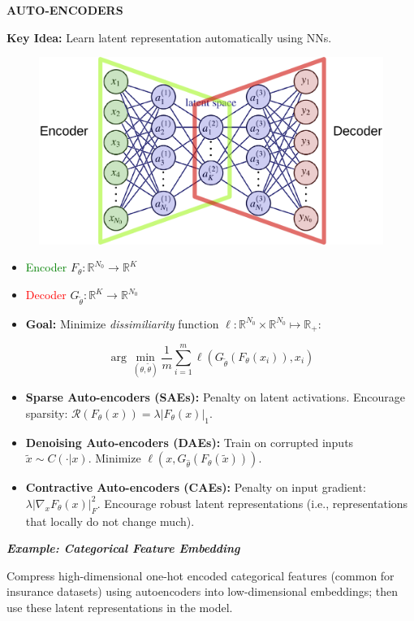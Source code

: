 \documentclass[a4paper,10pt]{article}
\def\R{\mathbb{R}}
\newcommand{\subtitle}[1]{\vspace{0.25cm}\begin{normalsize}\textbf{\textcolor{gray!150}{\uppercase{#1}}}\end{normalsize}}
\begin{document}
\begin{small}
\subtitle{Auto-encoders}

\textbf{Key Idea:} Learn latent representation automatically using NNs.
\begin{figure}
    \centering
    \vspace{-15pt}
    \includegraphics[width=0.45\columnwidth]{figures/Autoencoder.png}
    \vspace{-40pt}
\end{figure}
\begin{itemize}
    \item \textcolor{green}{Encoder} $F_\theta : \mathbb{R}^{N_0} \to \mathbb{R}^K$
    \item \textcolor{red}{Decoder} $G_{\tilde{\theta}} : \mathbb{R}^K \to \mathbb{R}^{N_0}$
    \item \textbf{Goal:} Minimize \textit{dissimiliarity} function $\ell: \mathbb{R}^{N_0} \times \mathbb{R}^{N_0} \mapsto \R_+$: 
\end{itemize}
$$
\arg \min_{(\theta, \tilde{\theta})} \frac{1}{m} \sum_{i=1}^m \ell(G_{\tilde{\theta}}(F_\theta(x_i)), x_i)
$$

\begin{itemize}
    \item \textbf{Sparse Auto-encoders (SAEs):} Penalty on latent activations. Encourage sparsity: $\mathcal{R}(F_{\theta}(x)) = \lambda |F_{\theta}(x)|_1$.
    \item \textbf{Denoising Auto-encoders (DAEs):} Train on corrupted inputs $\tilde{x} \sim C(\cdot | x)$. Minimize $\ell(x, G_{\hat{\theta}}(F_{\theta}(\tilde{x})))$. 
    \item \textbf{Contractive Auto-encoders (CAEs):} Penalty on input gradient: $\lambda |\nabla_x F_{\theta}(x)|_F^2$. Encourage robust latent representations (i.e., representations that locally do not change much).
\end{itemize}

\textit{\textbf{Example: Categorical Feature Embedding}}

Compress high-dimensional one-hot encoded categorical features (common for insurance datasets) using autoencoders into low-dimensional embeddings; then use these latent representations in the model.

\end{small}
\end{document}
